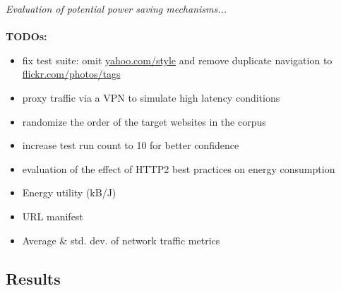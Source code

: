 \documentclass{article}
\begin{document}
\emph{Evaluation of potential power saving mechanisms...}
\\ \\
\textbf{TODOs:}
\begin{itemize}
    \item fix test suite: omit \url{yahoo.com/style} and remove duplicate navigation to \url{flickr.com/photos/tags}
    \item proxy traffic via a VPN to simulate high latency conditions
    \item randomize the order of the target websites in the corpus
    \item increase test run count to 10 for better confidence
    \item evaluation of the effect of HTTP2 best practices on energy consumption
    \item Energy utility (kB/J)
    \item URL manifest
    \item Average \& std. dev. of network traffic metrics
\end{itemize}


\subsection{Results}
\end{document}

